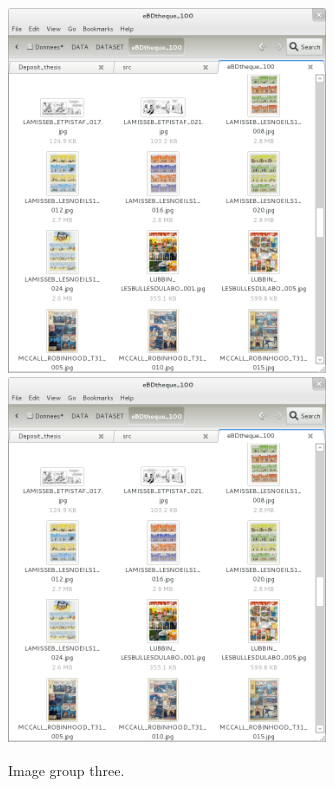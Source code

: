   \begin{figure}[h!]  %
    \centering
    
    \includegraphics[trim= 5px 10px 30px 152px, clip, width=0.75\textwidth]{thumb_05.png}
    \\
    \includegraphics[trim= 5px 10px 30px 152px, clip, width=0.75\textwidth]{thumb_06.png}
    \caption{Image group three.}
    \label{fig:app:5_6}
  \end{figure}

